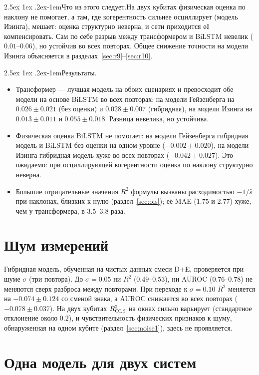 \documentclass[12pt,a4paper]{report}
\makeatletter
\renewcommand\paragraph{\@startsection{paragraph}{4}{\z@}%
  {2.5ex \@plus1ex \@minus.2ex}{-1em}{\normalfont\normalsize\bfseries}}
\numberwithin{equation}{chapter}
\newcommand{\figgen}{\paragraph{Что из этого следует.}}
\makeatother
\begin{document}
\figgen На двух кубитах физическая оценка по наклону не помогает, а там,
где когерентность сильнее осциллирует (модель Изинга), мешает: оценка
структурно неверна, и сети приходится её компенсировать. Сам по себе разрыв
между трансформером и BiLSTM невелик ($0.01$--$0.06$), но устойчив во всех
повторах. Общее снижение точности на модели Изинга объясняется в
разделах~\ref{sec:r9}--\ref{sec:r10}.


\paragraph{Результаты.}
\begin{itemize}
\item Трансформер --- лучшая модель на обоих сценариях и превосходит обе
      модели на основе BiLSTM во всех повторах: на модели Гейзенберга на
      $0.026\pm0.021$ (без оценки) и $0.028\pm0.007$ (гибридная), на модели
      Изинга на $0.013\pm0.011$ и $0.055\pm0.018$. Разница невелика, но
      устойчива.
\item Физическая оценка BiLSTM не помогает: на модели Гейзенберга гибридная
      модель и BiLSTM без оценки на одном уровне ($-0.002\pm0.020$), на
      модели Изинга гибридная модель хуже во всех повторах
      ($-0.042\pm0.027$). Это ожидаемо: при осциллирующей когерентности
      оценка по наклону структурно неверна.
\item Большие отрицательные значения $R^2$ формулы вызваны расходимостью
      $-1/\hat s$ при наклонах, близких к нулю (раздел~\ref{sec:ols}); её MAE
      ($1.75$ и $2.77$) хуже, чем у трансформера, в $3.5$--$3.8$ раза.
\end{itemize}

\section{Шум измерений}

Гибридная модель, обученная на чистых данных смеси D$+$E, проверяется при шуме
$\sigma$ (три повтора). До $\sigma=0.05$ ни $R^2$ ($0.49$--$0.53$), ни AUROC
($0.76$--$0.78$) не меняются сверх разброса между повторами. При переходе к
$\sigma=0.10$ $R^2$ меняется на $-0.074\pm0.124$ со сменой знака, а AUROC
снижается во всех повторах ($-0.078\pm0.037$). На двух кубитах
$R^2_{\rm OLS}$ на окнах сильно варьирует (стандартное отклонение около
$0.2$), и чувствительность физических признаков к шуму, обнаруженная на
одном кубите (раздел~\ref{sec:noise1}), здесь не проявляется.

\section{Одна модель для двух систем}
\label{sec:e11a}
\end{document}
